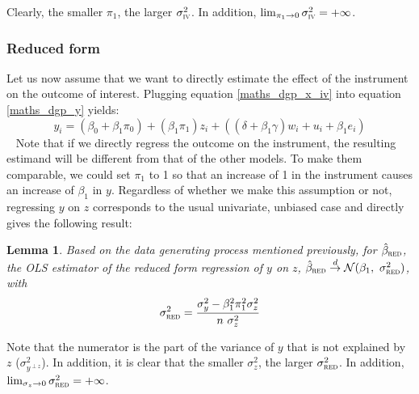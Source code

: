 \documentclass[usletter, 12pt]{article}
\newtheorem{lemma}{Lemma}
\begin{document}
			Clearly, the smaller $\pi_{1}$, the larger $\sigma_{\textsc{iv}}^{2}$. In addition, $\lim_{\pi_{1}\to 0} \sigma_{\textsc{iv}}^{2} = + \infty$.
			

				 

		\subsubsection{Reduced form}
		
			Let us now assume that we want to directly estimate the effect of the instrument on the outcome of interest. Plugging equation \ref{maths_dgp_x_iv} into equation \ref{maths_dgp_y} yields:			
				\[
					y_{i} = (\beta_{0} + \beta_{1}\pi_0) + (\beta_{1}\pi_{1}) z_{i} + ((\delta + \beta_{1}\gamma) w_{i} + u_{i} + \beta_{1}e_{i})
				\]
				~
				Note that if we directly regress the outcome on the instrument, the resulting estimand will be different from that of the other models. To make them comparable, we could set $\pi_{1}$ to 1 so that an increase of 1 in the instrument causes an increase of $\beta_{1}$ in $y$. Regardless of whether we make this assumption or not, regressing $y$ on $z$ corresponds to the usual univariate, unbiased case and directly gives the following result:
				
				\begin{lemma}\label{lemma_red}
					Based on the data generating process mentioned previously, for $\hat{\beta}_{\textsc{red}}$, the OLS estimator of the reduced form regression of $y$ on $z$,  $\hat{\beta}_{\textsc{red}} \overset{d}{\to} \mathcal{N}(\beta_{1}, \ \sigma_{\textsc{red}}^{2})$, with
					\[
						\sigma_{\textsc{red}}^{2} = \dfrac{\sigma_{y}^{2} - \beta_{1}^{2}\pi_{1}^{2}\sigma_{z}^{2}}{n \ \sigma_{z}^{2}}
					\]
				\end{lemma}
				
				Note that the numerator is the part of the variance of $y$ that is not explained by $z$ ($\sigma^{2}_{y^{\perp z}}$). In addition, it is clear that the smaller $\sigma_{z}^{2}$, the larger $\sigma_{\textsc{red}}^{2}$. In addition, $\lim_{\sigma_{z}\to 0} \sigma_{\textsc{red}}^{2} = + \infty$.\\
				
\end{document}
